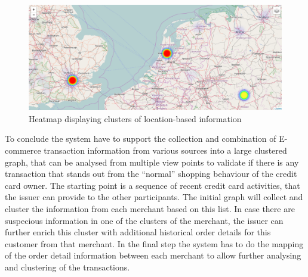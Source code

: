 \begin{figure}[H]
  \centering
  \includegraphics[width=0.9\columnwidth]{images/Heatmap.png}
  \caption{Heatmap displaying clusters of location-based information}
\label{fig:images_map_heatmap}
\end{figure}

To conclude the system have to support the collection and combination of E-commerce transaction information from various sources into a large clustered graph, that can be analysed from multiple view points to validate if there is any transaction that stands out from the ``normal'' shopping behaviour of the credit card owner. The starting point is a sequence of recent credit card activities, that the issuer can provide to the other participants. The initial graph will collect and cluster the information from each merchant based on this list. In case there are suspecious information in one of the clusters of the merchant, the issuer can further enrich this cluster with additional historical order details for this customer from that merchant. In the final step the system has to do the mapping of the order detail information between each merchant to allow further analysing and clustering of the transactions. 

